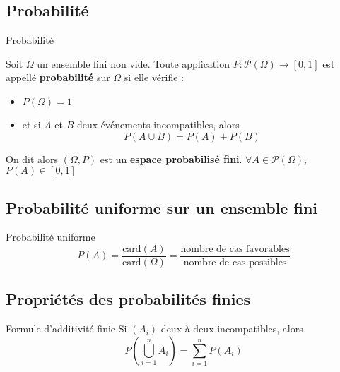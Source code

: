 \subsection{Probabilité} %
\label{sub:Probabilité}
\begin{Definition}[colbacktitle=red!75!black]{Probabilité}{}

  Soit $\Omega$ un ensemble fini non vide. Toute application $P: \mathscr{P}(\Omega) \to [0,1]$ est appellé \textbf{probabilité} sur $\Omega$ si elle vérifie :
  \begin{itemize}

      \item $P(\Omega) = 1$ 
      \item et si $A$ et $B$ deux événements incompatibles, alors 
        \begin{equation}
          P ( A \cup B) = P(A) + P(B)
        \end{equation}

  \end{itemize}

  On dit alors $(\Omega, P)$ est un \textbf{espace probabilisé fini}. $\forall A \in \mathscr{P}(\Omega)$, $P(A) \in [0, 1]$
\end{Definition}

\subsection{Probabilité uniforme sur un ensemble fini} %
\label{sub:Probabilité uniforme sur un ensemble fini}
\begin{Definition}[colbacktitle=red!75!black]{
    Probabilité uniforme
  }{}
\begin{equation}
  P(A) = \frac{\mathrm{card}(A)}{\mathrm{card}(\Omega)}  = \frac{\text{nombre de cas favorables}}{\text{nombre de cas possibles}} 
\end{equation}
\end{Definition}

\subsection{Propriétés des probabilités finies} %
\label{sub:Propriétés des probabilités finies}

\begin{Theorem}{Formule d'additivité finie}{}
Si $(A_i)$ deux à deux incompatibles, alors 
\begin{equation}
  P \left( \bigcup _{i=1} ^{n} A_i \right) = \sum_{i=1}^{n} P(A_i)
\end{equation}
\end{Theorem}


